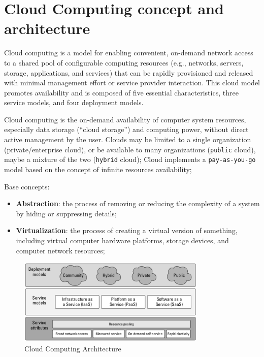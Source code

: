 
\chapter{Cloud Computing concept and architecture}

\begin{definitionblock}
    Cloud computing is a model for enabling
    convenient, on-demand network access to a
    shared pool of configurable computing
    resources (e.g., networks, servers, storage,
    applications, and services) that can be rapidly
    provisioned and released with minimal
    management effort or service provider
    interaction. This cloud model promotes availability and is
    composed of five essential characteristics,
    three service models, and four deployment
    models.
\end{definitionblock}

Cloud computing is the on-demand availability of computer system
resources, especially data storage (“cloud storage”) and computing power,
without direct active management by the user.
Clouds may be limited to a single organization (private/enterprise cloud), or
be available to many organizations (\texttt{public} cloud), maybe a mixture of the
two (\texttt{hybrid} cloud);
Cloud implements a \texttt{pay-as-you-go} model based on the concept of infinite
resources availability;

Base concepts:
\begin{itemize}
    \item \textbf{Abstraction}: the process of removing or reducing the
        complexity of a system by hiding or suppressing details;
    \item \textbf{Virtualization}: the process of creating a virtual version of
        something, including virtual computer hardware platforms, storage
        devices, and computer network resources;
\end{itemize}

\begin{figure}[H]
    \centering
    \includegraphics[width=0.8\textwidth]{assets/fig10.png}
    \caption{Cloud Computing Architecture}
    \label{fig:cloud-computing-architecture}
\end{figure}

